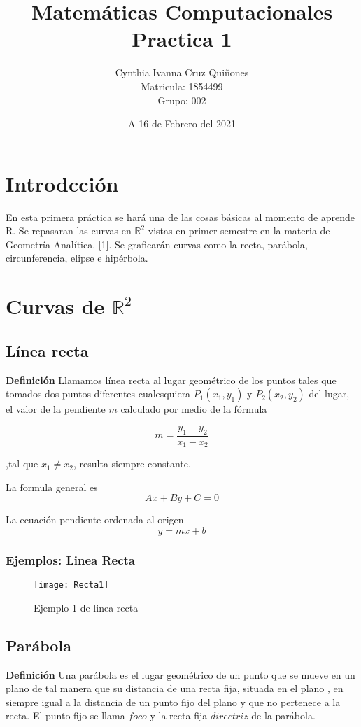 \documentclass[12pt,a4paper,draft]{article}
\author{Cynthia Ivanna Cruz Quiñones\\
Matricula: 1854499\\
Grupo: 002}
\title{Matemáticas Computacionales\\
Practica 1}
\date{A 16 de Febrero del 2021}
\begin{document}
\maketitle

\newpage
\tableofcontents

\newpage

\section{Introdcción}
En esta primera práctica se hará una de las cosas básicas al momento de aprende R. Se
repasaran las curvas en $\mathbb{R}^2$ vistas en primer semestre en la materia de Geometría Analítica. [1].
Se graficarán curvas como la recta, parábola, circunferencia, elipse e hipérbola.
\section{Curvas de $\mathbb{R}^2$} \label{sec:curvas}

\subsection{Línea recta} \label{subsec:linearecta}
\textbf{Definición}
Llamamos línea recta al lugar geométrico de los puntos tales que tomados dos puntos diferentes cualesquiera $P_{1}(x_{1}, y_{1})$ y $P_{2}(x_{2}, y_{2})$ del lugar, el valor de la pendiente $m$ calculado por medio de la fórmula 

$$ m = \frac{y_{1} - y_{2}}{x_{1} - x_{2}}$$ 

,tal que  ${x_{1}\neq x_{2}}$, resulta siempre constante. 

La formula general es
$$Ax + By + C = 0$$

La ecuación pendiente-ordenada al origen
$$y = mx + b$$

\subsubsection{Ejemplos: Linea Recta}

\begin{figure}
\centering 
\texttt{[image: Recta1]}
\caption{Ejemplo 1 de linea recta}
\end{figure}



\subsection{Parábola} \label{subsec:parabola}
\textbf{Definición} Una parábola es el lugar geométrico de un punto que se mueve en un plano de tal manera que su distancia de una recta fija, situada en el plano , en siempre igual a la distancia de un punto fijo del plano y que no pertenece a la recta.
El punto fijo se llama $foco$ y la recta fija $directriz$ de la parábola.
\end{document}
